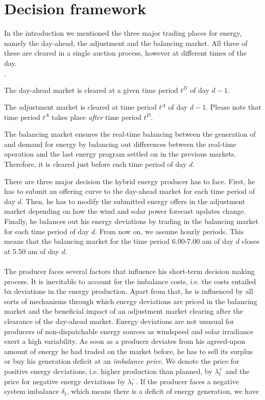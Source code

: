 \section{Decision framework}
In the introduction we mentioned the three major trading places for energy, namely the day-ahead, the adjustment and the balancing market. All three of these are cleared in a single auction process, however at different times of the day. 

\begin{list}{$\cdot$}{}
	\item The day-ahead market is cleared at a given time period $t^D$ of day $d-1$.
	\item The adjustment market is cleared at time period $t^{A}$ of day $d-1$. Please note that time period $t^{A}$ takes place \textit{after} time period $t^{D}$.
	\item The balancing market ensures the real-time balancing between the generation of and demand for energy by balancing out differences between the real-time operation and the last energy program settled on in the previous markets. Therefore, it is cleared just before each time period of day $d$. 
\end{list}
There are three major decision the hybrid energy producer has to face. First, he has to submit an offering curve to the day-ahead market for each time period of day $d$. Then, he has to modify the submitted energy offers in the adjustment market depending on how the wind and solar power forecast updates change. Finally, he balances out his energy deviations by trading in the balancing market for each time period of day $d$. From now on, we assume hourly periods. This means that the balancing market for the time period 6.00-7.00 am of day $d$ closes at 5.50 am of day $d$. 
\\
\\ The producer faces several factors that influence his short-term decision making process. It is inevitable to account for the imbalance costs, i.e. the costs entailed bx deviations in the energy production. Apart from that, he is influenced by all sorts of mechanisms through which energy deviations are priced in the balancing market and the beneficial impact of an adjustment market clearing after the clearance of the day-ahead market. Energy deviations are not unusual for producers of non-dispatchable energy sources as windspeed and solar irradiance exert a high variability. As soon as a producer deviates from his agreed-upon amount of energy he had traded on the market before, he has to sell its surplus or buy his generation deficit at an \textit{imbalance price}. We denote the price for positive energy deviations, i.e. higher production than planned, by $\lambda_{t}^{+}$ and the price for negative energy deviations by $\lambda_{t}^{-}$. If the producer faces a negative system imbalance $\delta_{t}$, which means there is a deficit of energy generation, we have
